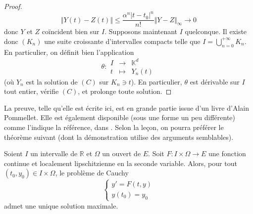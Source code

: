 \begin{proof}
    \[ \Vert Y(t) - Z(t) \Vert \leq \frac{\alpha^n |t-t_0|^n}{n!} \Vert Y-Z \Vert_{\infty} \longrightarrow 0 \]
    donc $Y$ et $Z$ coïncident bien sur $I$.
    \newpar
    Supposons maintenant $I$ quelconque. Il existe donc $(K_n)$ une suite croissante d'intervalles compacts telle que $I = \bigcup_{n = 0}^{+\infty} K_n$. En particulier, on définit bien l'application
    \[
    \theta :
    \begin{array}{ccc}
      I &\rightarrow& \mathbb{K}^d \\
      t &\mapsto& Y_n(t)
    \end{array}
    \]
    (où $Y_n$ est la solution de $(C)$ sur $K_n \ni t$). En particulier, $\theta$ est dérivable sur $I$ tout entier, vérifie $(C)$, et prolonge toute solution.
  \end{proof}

  La preuve, telle qu'elle est écrite ici, est en grande partie issue d'un livre d'Alain Pommellet. Elle est également disponible (sous une forme un peu différente) comme l'indique la référence, dans \cite{[DAN]}. Selon la leçon, on pourra préférer le théorème suivant (dont la démonstration utilise des arguments semblables).


  \begin{theorem}
    Soient $I$ un intervalle de $\mathbb{R}$ et $\Omega$ un ouvert de $E$. Soit $F : I \times \Omega \rightarrow E$ une fonction continue et localement lipschitzienne en la seconde variable. Alors, pour tout $(t_0, y_0) \in I \times \Omega$, le problème de Cauchy
    \[ \begin{cases} y'=F(t,y) \\ y(t_0) = y_0 \end{cases} \tag{$C$} \]
    admet une unique solution maximale.
  \end{theorem}

